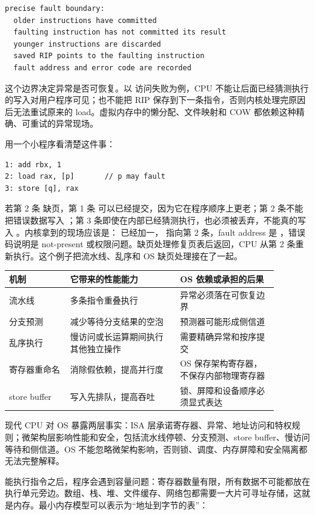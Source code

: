 \begin{lstlisting}
precise fault boundary:
  older instructions have committed
  faulting instruction has not committed its result
  younger instructions are discarded
  saved RIP points to the faulting instruction
  fault address and error code are recorded
\end{lstlisting}

这个边界决定异常是否可恢复。以  访问失败为例，CPU 不能让后面已经猜测执行的写入对用户程序可见；也不能把 RIP 保存到下一条指令，否则内核处理完原因后无法重试原来的 load。虚拟内存中的懒分配、文件映射和 COW 都依赖这种精确、可重试的异常现场。

用一个小程序看清楚这件事：

\begin{lstlisting}
1: add rbx, 1
2: load rax, [p]       // p may fault
3: store [q], rax
\end{lstlisting}

若第 2 条  缺页，第 1 条  可以已经提交，因为它在程序顺序上更老；第 2 条不能把错误数据写入 ；第 3 条即使在内部已经猜测执行，也必须被丢弃，不能真的写入 。内核拿到的现场应该是： 已经加一， 指向第 2 条，fault address 是 ，错误码说明是 not-present 或权限问题。缺页处理修复页表后返回，CPU 从第 2 条重新执行。这个例子把流水线、乱序和 OS 缺页处理接在了一起。

\begin{longtable}{p{0.2\linewidth}p{0.36\linewidth}p{0.32\linewidth}}
\toprule
机制 & 它带来的性能能力 & OS 依赖或承担的后果 \\
\midrule
流水线 & 多条指令重叠执行 & 异常必须落在可恢复边界 \\
分支预测 & 减少等待分支结果的空泡 & 预测器可能形成侧信道 \\
乱序执行 & 慢访问或长运算期间执行其他独立操作 & 需要精确异常和按序提交 \\
寄存器重命名 & 消除假依赖，提高并行度 & OS 保存架构寄存器，不保存内部物理寄存器 \\
store buffer & 写入先排队，提高吞吐 & 锁、屏障和设备顺序必须显式表达 \\
\bottomrule
\end{longtable}

现代 CPU 对 OS 暴露两层事实：ISA 层承诺寄存器、异常、地址访问和特权规则；微架构层影响性能和安全，包括流水线停顿、分支预测、store buffer、慢访问等待和侧信道。OS 不能忽略微架构影响，否则锁、调度、内存屏障和安全隔离都无法完整解释。

能执行指令之后，程序会遇到容量问题：寄存器数量有限，所有数据不可能都放在执行单元旁边。数组、栈、堆、文件缓存、网络包都需要一大片可寻址存储，这就是内存。最小内存模型可以表示为“地址到字节的表”：

